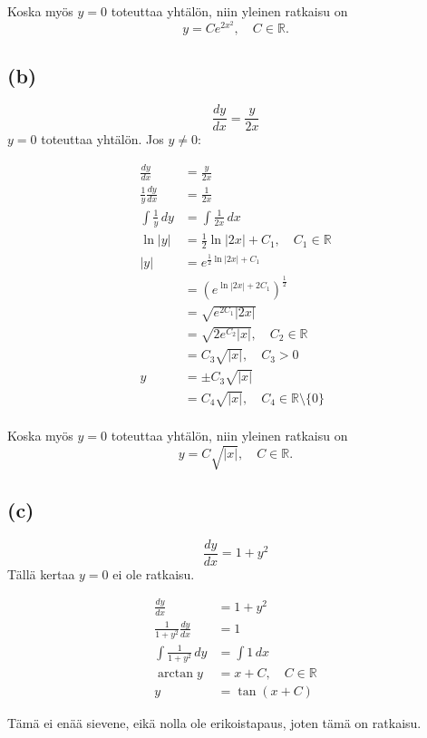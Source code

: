 \documentclass{article}
\begin{document}
Koska myös $y = 0$ toteuttaa yhtälön, niin yleinen ratkaisu on
\[
  y = Ce^{2x^2}, \quad C \in \mathbb{R}.
\]

\subsection*{(b)}
\[
  \frac{dy}{dx} = \frac{y}{2x}
\]
$y = 0$ toteuttaa yhtälön. Jos $y \neq 0$:

\begin{align*}
  \frac{dy}{dx} &= \frac{y}{2x} \\
  \frac{1}{y} \frac{dy}{dx} &= \frac{1}{2x} \\
  \int \frac{1}{y} \, dy &= \int \frac{1}{2x} \, dx \\
  \ln |y| &= \frac{1}{2} \ln |2x| + C_1, \quad C_1 \in \mathbb{R} \\
  |y| &= e^{\frac{1}{2} \ln |2x| + C_1} \\
      &= (e^{\ln |2x| + 2C_1})^{\frac{1}{2}} \\
      &= \sqrt{e^{2C_1} |2x|} \\
      &= \sqrt{2e^{C_2} |x|}, \quad C_2 \in \mathbb{R} \\
      &= C_3 \sqrt{|x|}, \quad C_3 > 0 \\
  y &= \pm C_3 \sqrt{|x|} \\
    &= C_4 \sqrt{|x|}, \quad C_4 \in \mathbb{R} \setminus \{0\} \\
\end{align*}

Koska myös $y = 0$ toteuttaa yhtälön, niin yleinen ratkaisu on
\[
  y = C \sqrt{|x|}, \quad C \in \mathbb{R}.
\]

\subsection*{(c)}
\[
  \frac{dy}{dx} = 1 + y^2
\]
Tällä kertaa $y = 0$ ei ole ratkaisu.

\begin{align*}
  \frac{dy}{dx} &= 1 + y^2 \\
  \frac{1}{1 + y^2} \frac{dy}{dx} &= 1 \\
  \int \frac{1}{1 + y^2} \, dy &= \int 1 \, dx \\
  \arctan y &= x + C, \quad C \in \mathbb{R} \\
  y &= \tan(x + C)
\end{align*}

Tämä ei enää sievene, eikä nolla ole erikoistapaus, joten tämä on ratkaisu.
\end{document}
